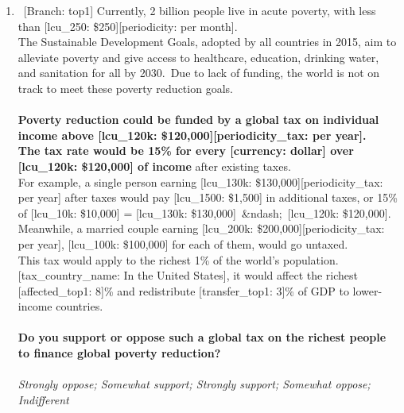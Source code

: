 \begin{enumerate}[resume]
\item ~[Branch: top1] \label{q:top1_tax_support} Currently, 2 billion people live in acute poverty, with less than [lcu\_250: \$250][periodicity: per month].\\The Sustainable Development Goals, adopted by all countries in 2015, aim to alleviate poverty and give access to healthcare, education, drinking water, and sanitation for all by 2030.~Due to lack of funding, the world is not on track to meet these poverty reduction goals.\\\\\textbf{Poverty reduction could be funded by a global tax on individual income above [lcu\_120k: \$120,000][periodicity\_tax: per year].~\\The tax rate would be 15\% for every [currency: dollar] over [lcu\_120k: \$120,000] of income} after existing taxes.~\\For example, a single person earning [lcu\_130k: \$130,000][periodicity\_tax: per year] after taxes would pay [lcu\_1500: \$1,500] in additional taxes, or 15\% of [lcu\_10k: \$10,000] = [lcu\_130k: \$130,000]~\&ndash;~[lcu\_120k: \$120,000]. Meanwhile, a married couple earning [lcu\_200k: \$200,000][periodicity\_tax: per year], [lcu\_100k: \$100,000] for each of them, would go untaxed.\\This tax would apply to the richest 1\% of the world's population. [tax\_country\_name: In the United States], it would affect the richest [affected\_top1: 8]\% and redistribute [transfer\_top1: 3]\% of GDP to lower-income countries.\\\\\textbf{Do you support or oppose such a global tax on the richest people to finance global poverty reduction?}\\ 
  \\ \textit{Strongly oppose; Somewhat support; Strongly support; Somewhat oppose; Indifferent}


\end{enumerate}
